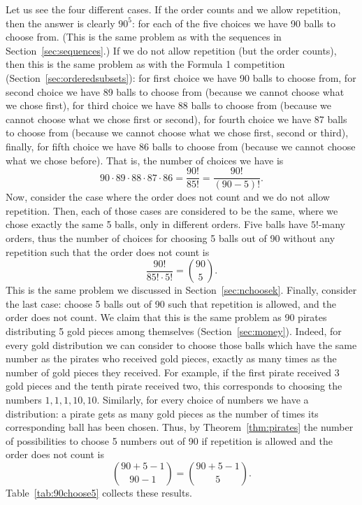 Let us see the four different cases. 
If the order counts and we allow repetition, 
then the answer is clearly $90^5$: 
for each of the five choices we have 90 balls to choose from. 
(This is the same problem as with the sequences in Section~\ref{sec:sequences}.)
If we do not allow repetition (but the order counts), 
then this is the same problem as with the Formula 1 competition (Section~\ref{sec:orderedsubsets}): 
for first choice we have 90 balls to choose from, 
for second choice we have 89 balls to choose from (because we cannot choose what we chose first), 
for third choice we have 88 balls to choose from (because we cannot choose what we chose first or second), 
for fourth choice we have 87 balls to choose from (because we cannot choose what we chose first, second or third), 
finally, for fifth choice we have 86 balls to choose from (because we cannot choose what we chose before). 
That is, the number of choices we have is 
\[
90 \cdot 89 \cdot 88 \cdot 87 \cdot 86 = \frac{90!}{85!} = \frac{90!}{(90-5)!}. 
\]
Now, consider the case where the order does not count and we do not allow repetition. 
Then, each of those cases are considered to be the same, 
where we chose exactly the same 5 balls, only in different orders. 
Five balls have $5!$-many orders, 
thus the number of choices for choosing 5 balls out of 90 without any repetition such that the order does not count is
\[
\frac{90!}{85! \cdot 5!} = \binom{90}{5}. 
\]
This is the same problem we discussed in Section~\ref{sec:nchoosek}. 
Finally, consider the last case: choose 5 balls out of 90 such that repetition is allowed, 
and the order does not count. 
We claim that this is the same problem as 90 pirates distributing 5 gold pieces among themselves (Section~\ref{sec:money}). 
Indeed, 
for every gold distribution we can consider to choose those balls which have the same number as the pirates who received gold pieces, 
exactly as many times as the number of gold pieces they received. 
For example, if the first pirate received 3 gold pieces and the tenth pirate received two, 
this corresponds to choosing the numbers $1, 1, 1, 10, 10$. 
Similarly, 
for every choice of numbers we have a distribution: 
a pirate gets as many gold pieces as the number of times its corresponding ball has been chosen. 
Thus, by Theorem~\ref{thm:pirates} the number of possibilities to choose 5 numbers out of 90 if repetition is allowed and the order does not count is
\[
\binom{90+5-1}{90-1} = \binom{90+5-1}{5}. 
\]
Table~\ref{tab:90choose5} collects these results. %


